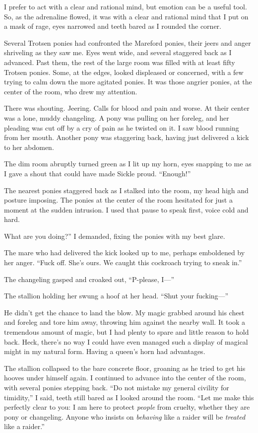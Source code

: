I prefer to act with a clear and rational mind, but emotion can be a useful tool. So, as the adrenaline flowed, it was with a clear and rational mind that I put on a mask of rage, eyes narrowed and teeth bared as I rounded the corner.

Several Trotsen ponies had confronted the Mareford ponies, their jeers and anger shriveling as they saw me. Eyes went wide, and several staggered back as I advanced. Past them, the rest of the large room was filled with at least fifty Trotsen ponies. Some, at the edges, looked displeased or concerned, with a few trying to calm down the more agitated ponies. It was those angrier ponies, at the center of the room, who drew my attention.

There was shouting. Jeering. Calls for blood and pain and worse. At their center was a lone, muddy changeling. A pony was pulling on her foreleg, and her pleading was cut off by a cry of pain as he twisted on it. I saw blood running from her mouth. Another pony was staggering back, having just delivered a kick to her abdomen.

The dim room abruptly turned green as I lit up my horn, eyes snapping to me as I gave a shout that could have made Sickle proud. “Enough!”

The nearest ponies staggered back as I stalked into the room, my head high and posture imposing. The ponies at the center of the room hesitated for just a moment at the sudden intrusion. I used that pause to speak first, voice cold and hard.

\leavevmode{}What are you doing?” I demanded, fixing the ponies with my best glare.

The mare who had delivered the kick looked up to me, perhaps emboldened by her anger. “Fuck off. She’s ours. We caught this cockroach trying to sneak in.”

The changeling gasped and croaked out, “P-please, I—”

The stallion holding her swung a hoof at her head. “Shut your fucking—”

He didn’t get the chance to land the blow. My magic grabbed around his chest and foreleg and tore him away, throwing him against the nearby wall. It took a tremendous amount of magic, but I had plenty to spare and little reason to hold back. Heck, there’s no way I could have even managed such a display of magical might in my natural form. Having a queen’s horn had advantages.

The stallion collapsed to the bare concrete floor, groaning as he tried to get his hooves under himself again. I continued to advance into the center of the room, with several ponies stepping back. “Do not mistake my general civility for timidity,” I said, teeth still bared as I looked around the room. “Let me make this perfectly clear to you: I am here to protect \textit{people} from cruelty, whether they are pony or changeling. Anyone who insists on \textit{behaving} like a raider will be \textit{treated} like a raider.”

